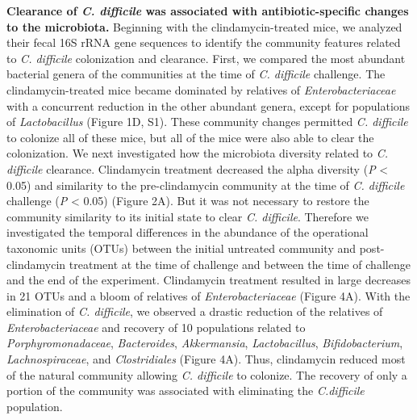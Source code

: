 \documentclass[11pt,]{article}
\begin{document}
\textbf{Clearance of \emph{C. difficile} was associated with
antibiotic-specific changes to the microbiota.} Beginning with the
clindamycin-treated mice, we analyzed their fecal 16S rRNA gene
sequences to identify the community features related to \emph{C.
difficile} colonization and clearance. First, we compared the most
abundant bacterial genera of the communities at the time of \emph{C.
difficile} challenge. The clindamycin-treated mice became dominated by
relatives of \emph{Enterobacteriaceae} with a concurrent reduction in
the other abundant genera, except for populations of
\emph{Lactobacillus} (Figure 1D, S1). These community changes permitted
\emph{C. difficile} to colonize all of these mice, but all of the mice
were also able to clear the colonization. We next investigated how the
microbiota diversity related to \emph{C. difficile} clearance.
Clindamycin treatment decreased the alpha diversity (\emph{P}
\textless{} 0.05) and similarity to the pre-clindamycin community at the
time of \emph{C. difficile} challenge (\emph{P} \textless{} 0.05)
(Figure 2A). But it was not necessary to restore the community
similarity to its initial state to clear \emph{C. difficile}. Therefore
we investigated the temporal differences in the abundance of the
operational taxonomic units (OTUs) between the initial untreated
community and post-clindamycin treatment at the time of challenge and
between the time of challenge and the end of the experiment. Clindamycin
treatment resulted in large decreases in 21 OTUs and a bloom of
relatives of \emph{Enterobacteriaceae} (Figure 4A). With the elimination
of \emph{C. difficile}, we observed a drastic reduction of the relatives
of \emph{Enterobacteriaceae} and recovery of 10 populations related to
\emph{Porphyromonadaceae}, \emph{Bacteroides}, \emph{Akkermansia},
\emph{Lactobacillus}, \emph{Bifidobacterium}, \emph{Lachnospiraceae},
and \emph{Clostridiales} (Figure 4A). Thus, clindamycin reduced most of
the natural community allowing \emph{C. difficile} to colonize. The
recovery of only a portion of the community was associated with
eliminating the \emph{C.difficile} population.
\end{document}
